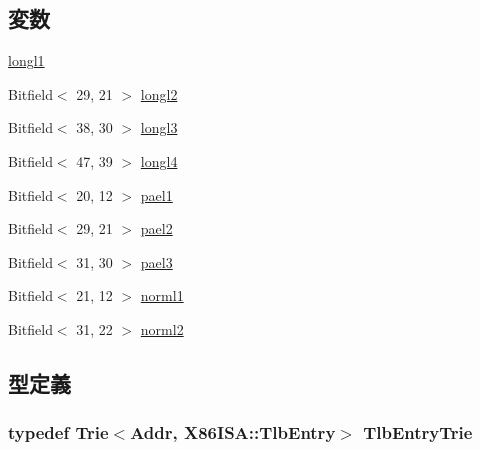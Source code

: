 \subsection*{変数}
\begin{DoxyCompactItemize}
\item 
\hyperlink{namespaceX86ISA_a2df3b770b75b2863de3e2258b71945cb}{longl1}
\item 
Bitfield$<$ 29, 21 $>$ \hyperlink{namespaceX86ISA_a7f152ead04fba9b14abd1068f148add6}{longl2}
\item 
Bitfield$<$ 38, 30 $>$ \hyperlink{namespaceX86ISA_a00e18fee73ee9aef71c0ea9dc0c0a8a6}{longl3}
\item 
Bitfield$<$ 47, 39 $>$ \hyperlink{namespaceX86ISA_a3b530e832420d1e43321be7126db2c61}{longl4}
\item 
Bitfield$<$ 20, 12 $>$ \hyperlink{namespaceX86ISA_a541e3530d0b0f23502c18586337ee243}{pael1}
\item 
Bitfield$<$ 29, 21 $>$ \hyperlink{namespaceX86ISA_abc575d753d5773b80938c25879afea66}{pael2}
\item 
Bitfield$<$ 31, 30 $>$ \hyperlink{namespaceX86ISA_ac5906e9f191805a7e1bf75c616503363}{pael3}
\item 
Bitfield$<$ 21, 12 $>$ \hyperlink{namespaceX86ISA_aa4dcc3fc4835349492b2c3024ae2a224}{norml1}
\item 
Bitfield$<$ 31, 22 $>$ \hyperlink{namespaceX86ISA_a8820b4b084a309650068f08c9f0d54ae}{norml2}
\end{DoxyCompactItemize}


\subsection{型定義}
\hypertarget{x86_2pagetable_8hh_a1a855102cbce9987409c2af2be05f316}{
\subsubsection[{TlbEntryTrie}]{\setlength{\rightskip}{0pt plus 5cm}typedef {\bf Trie}$<${\bf Addr}, X86ISA::TlbEntry$>$ {\bf TlbEntryTrie}}}
\label{x86_2pagetable_8hh_a1a855102cbce9987409c2af2be05f316}
